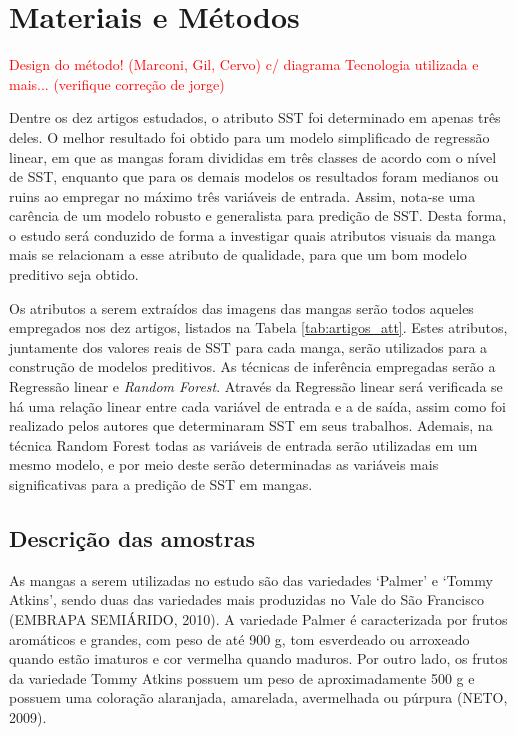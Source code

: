 \chapter{Materiais e Métodos} \label{ch:MM} %

\textcolor{red}{Design do método! (Marconi, Gil, Cervo) c/ diagrama}
\textcolor{red}{Tecnologia utilizada e mais... (verifique correção de jorge)}

Dentre os dez artigos estudados, o atributo SST foi determinado em apenas três deles. O melhor resultado foi obtido para um modelo simplificado de regressão linear, em que as mangas foram divididas em três classes de acordo com o nível de SST, enquanto que para os demais modelos os resultados foram medianos ou ruins ao empregar no máximo três variáveis de entrada. Assim, nota-se uma carência de um modelo robusto e generalista para predição de SST. Desta forma, o estudo será conduzido de forma a investigar quais atributos visuais da manga mais se relacionam a esse atributo de qualidade, para que um bom modelo preditivo seja obtido.

Os atributos a serem extraídos das imagens das mangas serão todos aqueles empregados nos dez artigos, listados na Tabela \ref{tab:artigos_att}. Estes atributos, juntamente dos valores reais de SST para cada manga, serão utilizados para a construção de modelos preditivos. As técnicas de inferência empregadas serão a Regressão linear e \textit{Random Forest}. Através da Regressão linear será verificada se há uma relação linear entre cada variável de entrada e a de saída, assim como foi realizado pelos autores que determinaram SST em seus trabalhos. Ademais, na técnica Random Forest todas as variáveis de entrada serão utilizadas em um mesmo modelo, e por meio deste serão determinadas as variáveis mais significativas para a predição de SST em mangas. 

\section{Descrição das amostras}

As mangas a serem utilizadas no estudo são das variedades ‘Palmer’ e ‘Tommy Atkins’, sendo duas das variedades mais produzidas no Vale do São Francisco (EMBRAPA SEMIÁRIDO, 2010). A variedade Palmer é caracterizada por frutos aromáticos e grandes, com peso de até 900 g, tom esverdeado ou arroxeado quando estão imaturos e cor vermelha quando maduros. Por outro lado, os frutos da variedade Tommy Atkins possuem um peso de aproximadamente 500 g e possuem uma coloração alaranjada, amarelada, avermelhada ou púrpura (NETO, 2009). 


